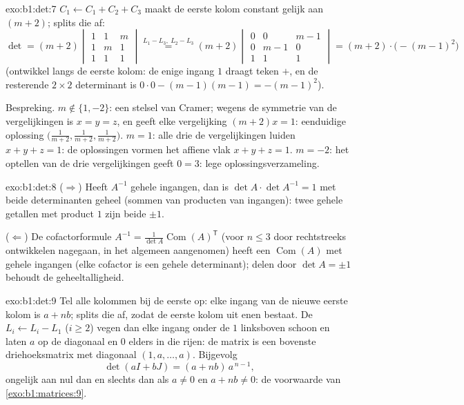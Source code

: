 \begin{solution}{exo:b1:det:7}
$C_1 \leftarrow C_1 + C_2 + C_3$ maakt de eerste kolom constant
gelijk aan $(m+2)$; splits die af:
\[
\det = (m+2)\begin{vmatrix}
1 & 1 & m\\ 1 & m & 1\\ 1 & 1 & 1
\end{vmatrix}
\overset{L_1 - L_3,\ L_2 - L_3}{=}
(m+2)\begin{vmatrix}
0 & 0 & m-1\\ 0 & m-1 & 0\\ 1 & 1 & 1
\end{vmatrix}
= (m+2)\cdot\bigl(-(m-1)^2\bigr)
\]
(ontwikkel langs de eerste kolom: de enige ingang $1$ draagt teken
$+$, en de resterende $2 \times 2$ determinant is $0 \cdot 0 -
(m-1)(m-1) = -(m-1)^2$).

Bespreking. $m \notin \{1, -2\}$: een stelsel van Cramer; wegens de
symmetrie van de vergelijkingen is $x = y = z$, en geeft elke
vergelijking $(m + 2)x = 1$: eenduidige oplossing
$\bigl(\frac{1}{m+2}, \frac{1}{m+2}, \frac{1}{m+2}\bigr)$. $m = 1$:
alle drie de vergelijkingen luiden $x + y + z = 1$: de oplossingen
vormen het affiene vlak $x + y + z = 1$. $m = -2$: het optellen van
de drie vergelijkingen geeft $0 = 3$: lege
oplossingsverzameling.
\end{solution}

\begin{solution}{exo:b1:det:8}
($\Rightarrow$) Heeft $A^{-1}$ gehele ingangen, dan is $\det A \cdot
\det A^{-1} = 1$ met beide determinanten geheel (sommen van
producten van ingangen): twee gehele getallen met product $1$ zijn
beide $\pm1$.

($\Leftarrow$) De cofactorformule $A^{-1} = \frac{1}{\det A}
\operatorname{Com}(A)^{\mathsf T}$ (voor $n \leq 3$ door
rechtstreeks ontwikkelen nagegaan, in het algemeen aangenomen) heeft
een $\operatorname{Com}(A)$ met gehele ingangen (elke cofactor is
een gehele determinant); delen door $\det A = \pm 1$ behoudt de
geheeltalligheid.
\end{solution}

\begin{solution}{exo:b1:det:9}
Tel alle kolommen bij de eerste op: elke ingang van de nieuwe eerste
kolom is $a + nb$; splits die af, zodat de eerste kolom uit enen
bestaat. De  $L_i \leftarrow L_i - L_1$ ($i \geq 2$)
vegen dan elke ingang onder de $1$ linksboven schoon en laten $a$ op
de diagonaal en $0$ elders in die rijen: de matrix is een bovenste
driehoeksmatrix met diagonaal $(1, a, \dots, a)$. Bijgevolg
\[
\det(aI + bJ) = (a + nb)\, a^{\,n-1} ,
\]
ongelijk aan nul dan en slechts dan als $a \neq 0$ en $a + nb \neq
0$: de voorwaarde van \cref{exo:b1:matrices:9}.
\end{solution}

